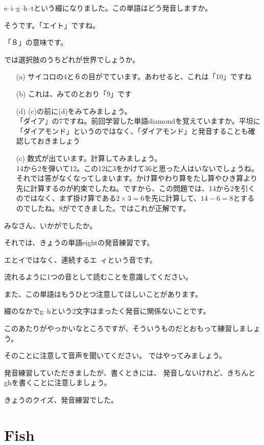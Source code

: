 \documentclass[12pt]{jlreq}
\begin{document}
{\large \ComputerMouse}

e--i--g--h--tという綴になりました。この単語はどう発音しますか。

そうです。「エイト」ですね。

「８」の意味です。

では選択肢のうちどれが世界でしょうか。

\begin{itemize}
 \item[(a)] サイコロの4と６の目がでています。あわせると、これは「10」ですね
 \item[(b)] これは、みてのとおり「9」です
 \item[(d)] (c)の前に(d)をみてみましょう。\\
「ダイア」の7ですね。前回学習した単語diamondを覚えていますか。平坦に「ダイアモンド」というのではなく、「{\gtfamily ダ}イアモンド」と発音することも確認しておきましょう
 \item[(c)] 数式が出ています。計算してみましょう。\\
14から2を弾いて12。この12に3をかけて36と思った人はいないでしょうね。それでは答がなくなってしまいます。かけ算やわり算をたし算やひき算より先に計算するのが約束でしたね。ですから、この問題では、14から2を引くのではなく、まず掛け算である$2\times{3}=6$を先に計算して、$14-6=8$とするのでしたね。8がでてきました。ではこれが正解です。
\end{itemize}

みなさん、いかがでしたか。

それでは、きょうの単語eightの発音練習です。

エとイではなく、連続するエ~ィという音です。

流れるように1つの音として読むことを意識してください。

また、この単語はもうひとつ注意してほしいことがあります。

綴のなかでg--hという2文字はまったく発音に関係ないことです。

このあたりがやっかいなところですが、そういうものだとおもって練習しましょう。


そのことに注意して音声を聞いてください。
ではやってみましょう。

発音練習していただきましたが、書くときには、
発音しないけれど、きちんとghを書くことに注意しましょう。


きょうのクイズ、発音練習でした。
\section{Fish}
\end{document}
